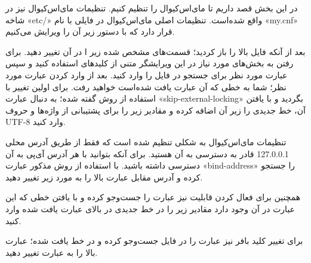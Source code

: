  در این بخش قصد داریم تا مای‌اس‌کیوال را تنظیم کنیم. تنظیمات مای‌اس‌کیوال نیز در شاخه «etc/» واقع شده‌است. تنظیمات اصلی مای‌اس‌کیوال در فایلی با نام «my.cnf» قرار دارد که با دستور زیر آن را ویرایش می‌کنیم.
 \newline
 \begin{latin}  
     
    \end{latin}
    بعد از آنکه فایل بالا را باز کردید؛ قسمت‌های مشخص شده زیر ا در آن تغییر دهید. برای رفتن به بخش‌های مورد نیاز در این ویرایشگر متنی از کلید‌های 
     استفاده کنید و سپس عبارت مورد نظر برای جستجو در فایل را وارد کنید. بعد از وارد کردن عبارت مورد نظر؛ شما به خطی که آن عبارت یافت شده‌است خواهید رفت. برای اولین تغییر با استفاده از روش گفته شده؛ به دنبال عبارت «skip-external-locking» بگردید و با یافتن آن، خط جدیدی را زیر آن اضافه کرده و مقادیر زیر را برای پشتیبانی از واژه‌ها و حروف UTF-8 وارد کنید.
  \newline
  \begin{latin}  
      
    \end{latin}
    تنظیمات مای‌اس‌کیوال به شکلی تنظیم شده است که فقط از طریق آدرس محلی 127.0.0.1 قادر به دسترسی به آن هستید. برای آنکه بتوانید با هر آدرس آی‌پی به آن دسترسی داشته باشید. با استفاده از روش مذکور عبارت «bind-address» را جستجو کرده و آدرس مقابل عبارت بالا را به مورد زیر تغییر دهید.
\newline
 \begin{latin}  
 
\end{latin}
همچنین برای فعال کردن قابلیت 
 نیز عبارت 
 را جست‌وجو کرده و با یافتن خطی که این عبارت در آن وجود دارد مقادیر زیر را در خط جدیدی در بالای عبارت یافت شده وارد کنید.
\newline
\begin{latin}  
    
\end{latin}
برای تغییر کلید بافر نیز عبارت 
 را در فایل جست‌وجو کرده و در خط یافت شده؛ عبارت بالا را به عبارت 
  تغییر دهید.
\newline
